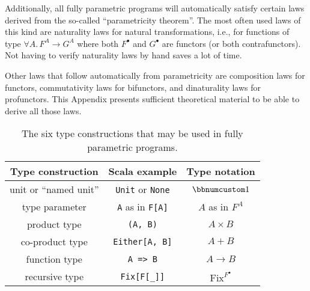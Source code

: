 Additionally, all fully parametric programs will automatically satisfy
certain laws derived from the so-called \textsf{``}parametricity theorem\textsf{''}.
The most often used laws of this kind are naturality laws for natural
transformations, i.e., for functions of type $\forall A.\,F^{A}\rightarrow G^{A}$
where both $F^{\bullet}$ and $G^{\bullet}$ are functors (or both
contrafunctors). Not having to verify naturality laws by hand saves
a lot of time.

Other laws that follow automatically from parametricity are composition
laws for functors, commutativity laws for bifunctors, and dinaturality
laws for profunctors. This Appendix presents sufficient theoretical
material to be able to derive all those laws. 

\begin{wraptable}{l}{0.545\columnwidth}%
\begin{centering}
\vspace{-0.2\baselineskip}
\begin{tabular}{|c|c|c|}
\hline 
\textbf{\small{}Type construction} & \textbf{\small{}Scala example} & \textbf{\small{}Type notation}\tabularnewline
\hline 
\hline 
{\small{}unit or \textsf{``}named unit\textsf{''}} & {\small{}}\lstinline!Unit!{\small{} or }\lstinline!None!{\small{} } & {\small{}$\bbnum 1$}\tabularnewline
\hline 
{\small{}type parameter} & {\small{}}\lstinline!A!{\small{} as in }\lstinline!F[A]!{\small{} } & {\small{}$A$ as in $F^{A}$}\tabularnewline
\hline 
{\small{}product type} & {\small{}}\lstinline!(A, B)! & {\small{}$A\times B$}\tabularnewline
\hline 
{\small{}co-product type} & {\small{}}\lstinline!Either[A, B]! & {\small{}$A+B$}\tabularnewline
\hline 
{\small{}function type} & {\small{}}\lstinline!A => B! & {\small{}$A\rightarrow B$}\tabularnewline
\hline 
{\small{}recursive type} & {\small{}}\lstinline!Fix[F[_]]! & {\small{}$\text{Fix}^{F^{\bullet}}$}\tabularnewline
\hline 
\end{tabular}
\par\end{centering}
\caption{The six type constructions
that may be used in fully parametric programs.\label{tab:six-pure-type-constructions}}
\vspace{-0.2\baselineskip}
\end{wraptable}%

